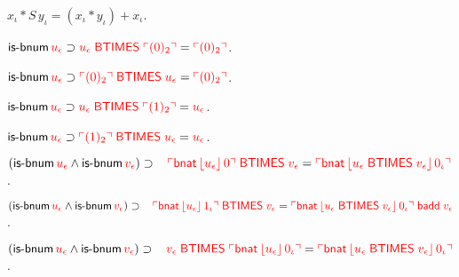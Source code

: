 \begin{biformthy}
    \item $x_\iota * S \, y_\iota = (x_\iota * y_\iota) + x_\iota$.

    \item $\mbox{\sf is-bnum} \, \textcolor{red}{u_\epsilon} \supset
      \textcolor{red}{u_\epsilon \; \mbox{\sf BTIMES} \; \ulcorner(0)_2\urcorner} =
      \textcolor{red}{\ulcorner(0)_2\urcorner}$.

    \item $\mbox{\sf is-bnum} \, \textcolor{red}{u_\epsilon} \supset \textcolor{red}{
      \ulcorner(0)_2\urcorner \; \mbox{\sf BTIMES} \; u_\epsilon} =
      \textcolor{red}{\ulcorner(0)_2\urcorner}$.

    \item $\mbox{\sf is-bnum} \, \textcolor{red}{u_\epsilon} \supset
      \textcolor{red}{u_\epsilon \; \mbox{\sf BTIMES} \; \ulcorner(1)_2\urcorner} =
      \textcolor{red}{u_\epsilon}$.

    \item $\mbox{\sf is-bnum} \, \textcolor{red}{u_\epsilon} \supset
      \textcolor{red}{\ulcorner(1)_2\urcorner \; \mbox{\sf BTIMES} \; u_\epsilon} =
      \textcolor{red}{u_\epsilon}$.

    \item $(\mbox{\sf is-bnum} \, \textcolor{red}{u_\epsilon} \wedge \mbox{\sf is-bnum}
      \, \textcolor{red}{v_\epsilon}) \supset {}\\
        \hspace*{2ex} \textcolor{red}{\ulcorner\mbox{\sf bnat} \,
            \lfloor u_\epsilon\rfloor \, 0\urcorner \; \mbox{\sf BTIMES} \;
          \textcolor{red}{v_\epsilon}} = \textcolor{red}{\ulcorner\mbox{\sf bnat} \,
            \lfloor u_\epsilon \; \mbox{\sf BTIMES} \; v_\epsilon\rfloor \,
            0_\iota\urcorner}$.

    \item $(\mbox{\sf is-bnum} \, \textcolor{red}{u_\epsilon} \wedge \mbox{\sf is-bnum}
      \, \textcolor{red}{v_\epsilon}) \supset {}\\
        \hspace*{2ex} \textcolor{red}{\ulcorner\mbox{\sf bnat} \,
            \lfloor u_\epsilon\rfloor \, 1_\iota\urcorner \; \mbox{\sf BTIMES} \;
          \textcolor{red}{v_\epsilon}} = \textcolor{red}{\ulcorner\mbox{\sf bnat} \,
            \lfloor u_\epsilon \; \mbox{\sf BTIMES} \; v_\epsilon\rfloor \,
            0_\iota\urcorner \; \mbox{\sf badd} \; v_\epsilon}$.

    \item $(\mbox{\sf is-bnum} \, \textcolor{red}{u_\epsilon} \wedge \mbox{\sf is-bnum}
      \, \textcolor{red}{v_\epsilon}) \supset {}\\
        \hspace*{2ex} \textcolor{red}{\textcolor{red}{v_\epsilon}\; \mbox{\sf BTIMES} \;
          \ulcorner\mbox{\sf bnat} \, \lfloor u_\epsilon\rfloor \, 0_\iota\urcorner} =
        \textcolor{red}{\ulcorner\mbox{\sf bnat} \, \lfloor u_\epsilon \;
              \mbox{\sf BTIMES} \; v_\epsilon\rfloor \, 0_\iota\urcorner}$.


\end{biformthy}
